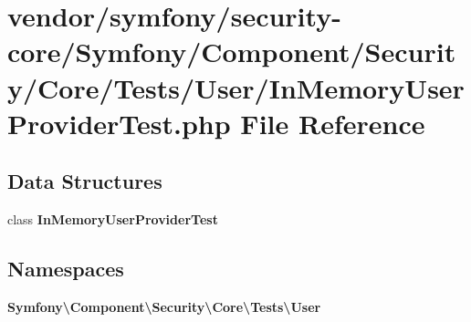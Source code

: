 \section{vendor/symfony/security-\/core/\+Symfony/\+Component/\+Security/\+Core/\+Tests/\+User/\+In\+Memory\+User\+Provider\+Test.php File Reference}
\label{_in_memory_user_provider_test_8php}
\subsection*{Data Structures}
\begin{DoxyCompactItemize}
\item 
class {\bf In\+Memory\+User\+Provider\+Test}
\end{DoxyCompactItemize}
\subsection*{Namespaces}
\begin{DoxyCompactItemize}
\item 
 {\bf Symfony\textbackslash{}\+Component\textbackslash{}\+Security\textbackslash{}\+Core\textbackslash{}\+Tests\textbackslash{}\+User}
\end{DoxyCompactItemize}
